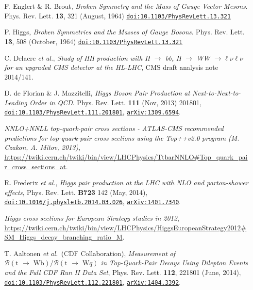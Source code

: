 \documentclass[10pt,a4paper]{article}
\newcommand{\etal}{\emph{et al.}}
\begin{document}
\begin{thebibliography}{1}

 F. Englert \& R. Brout, \emph{Broken Symmetry and the Mass of Gauge Vector Mesons}. Phys. Rev. Lett. \textbf{13}, 321 (August, 1964)
\href{http://dx.doi.org/10.1103/PhysRevLett.13.321}{\texttt{doi:10.1103/PhysRevLett.13.321}}

 P. Higgs, \emph{Broken Symmetries and the Masses of Gauge Bosons}. Phys. Rev. Lett. \textbf{13}, 508 (October, 1964)
\href{http://dx.doi.org/10.1103/PhysRevLett.13.508}{\texttt{doi:10.1103/PhysRevLett.13.321}}

 C. Delaere \etal, \emph{Study of HH production with H $\rightarrow$ bb, H $\rightarrow$ WW $\rightarrow \ell\nu\ell\nu$ for an upgraded CMS detector at the HL-LHC}, CMS draft analysis note 2014/141.

 D. de Florian \& J. Mazzitelli, \emph{Higgs Boson Pair Production at Next-to-Next-to-Leading Order in QCD}. Phys. Rev. Lett. \textbf{111} (Nov, 2013) 201801,
\href{http://journals.aps.org/prl/abstract/10.1103/PhysRevLett.111.201801}{\texttt{doi:10.1103/PhysRevLett.111.201801}},
\href{http://arxiv.org/abs/1309.6594}{\texttt{arXiv:1309.6594}}.

 \emph{NNLO+NNLL top-quark-pair cross sections - ATLAS-CMS recommended predictions for top-quark-pair cross sections using the Top++v2.0 program (M. Czakon, A. Mitov, 2013)}, \url{https://twiki.cern.ch/twiki/bin/view/LHCPhysics/TtbarNNLO#Top_quark_pair_cross_sections_at}.

 R. Frederix \etal, \emph{Higgs pair production at the LHC with NLO and parton-shower effects}, Phys. Rev. Lett. \textbf{B723} 142 (May, 2014),
\href{http://dx.doi.org/10.1016/j.physletb.2014.03.026}{\texttt{doi:10.1016/j.physletb.2014.03.026}}, 
\href{http://link.aps.org/doi/10.1103/PhysRevLett.112.221801}{\texttt{arXiv:1401.7340}}.

 \emph{Higgs cross sections for European Strategy studies in 2012}, 
\url{https://twiki.cern.ch/twiki/bin/view/LHCPhysics/HiggsEuropeanStrategy2012#SM_Higgs_decay_branching_ratio_M}.


 T. Aaltonen \etal\ (CDF Collaboration), \emph{Measurement of $\mathcal{B}(\text{t $\rightarrow$ Wb}) / \mathcal{B}(\text{t $\rightarrow$ W$q$})$ in Top-Quark-Pair Decays Using Dilepton Events and the Full CDF Run II Data Set}, Phys. Rev. Lett. \textbf{112}, 221801 (June, 2014), 
\href{http://journals.aps.org/prl/abstract/10.1103/PhysRevLett.112.221801}{\texttt{doi:10.1103/PhysRevLett.112.221801}},
\href{http://arxiv.org/abs/1404.3392}{\texttt{arXiv:1404.3392}}.


\end{thebibliography}
\end{document}
